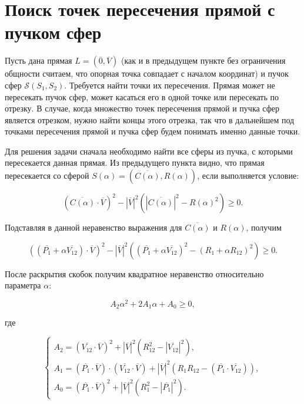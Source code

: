 \documentclass[a4paper,10pt]{extarticle}                     %
\numberwithin{equation}{section}                             %
\numberwithin{figure}{section}                               %
\theoremstyle{plain}                                         %
\begin{document}
\section{Поиск точек пересечения прямой с пучком сфер}

Пусть дана прямая $L = (\overline{0}, \overline{V})$ (как и в предыдущем пункте без ограничения общности считаем, что опорная точка совпадает с началом координат) и пучок сфер $\mathcal{S}(S_1, S_2)$.
Требуется найти точки их пересечения.
Прямая может не пересекать пучок сфер, может касаться его в одной точке или пересекать по отрезку.
В случае, когда множество точек пересечения прямой и пучка сфер является отрезком, нужно найти концы этого отрезка, так что в дальнейшем под точками пересечения прямой и пучка сфер будем понимать именно данные точки.

Для решения задачи сначала необходимо найти все сферы из пучка, с которыми пересекается данная прямая.
Из предыдущего пункта видно, что прямая пересекается со сферой $S(\alpha) = (\overline{C(\alpha)}, R(\alpha))$, если выполняется условие:

\begin{equation}
    (\overline{C(\alpha)}\cdot\overline{V})^2 - {|\overline{V}|}^2({|\overline{C(\alpha)}|}^2 - R(\alpha)^2) \ge 0.
\end{equation}

Подставляя в данной неравенство выражения для $\overline{C(\alpha)}$ и $R(\alpha)$, получим

\begin{equation}
    \left((\overline{P_1} + \alpha\overline{V_{12}})\cdot\overline{V}\right)^2 - {|\overline{V}|}^2\left((\overline{P_1} + \alpha\overline{V_{12}})^2 - (R_1 + \alpha R_{12})^2\right) \ge 0.
\end{equation}

После раскрытия скобок получим квадратное неравенство относительно параметра $\alpha$:

\begin{equation}
    A_2 \alpha^2 + 2A_1 \alpha + A_0 \ge 0,
\end{equation}

где

\begin{equation}
    \begin{cases}
        A_2 = (\overline{V_{12}}\cdot\overline{V})^2 + |\overline{V}|^2(R_{12}^2 - |\overline{V_{12}}|^2), \\
        A_1 = (\overline{P_1}\cdot\overline{V})\cdot(\overline{V_{12}}\cdot\overline{V}) + |\overline{V}|^2(R_1R_{12} - (\overline{P_1}\cdot\overline{V_{12}})), \\
        A_0 = (\overline{P_1}\cdot\overline{V})^2 + |\overline{V}|^2(R_1^2 - |\overline{P_1}|^2).
    \end{cases}
\end{equation}
\end{document}
